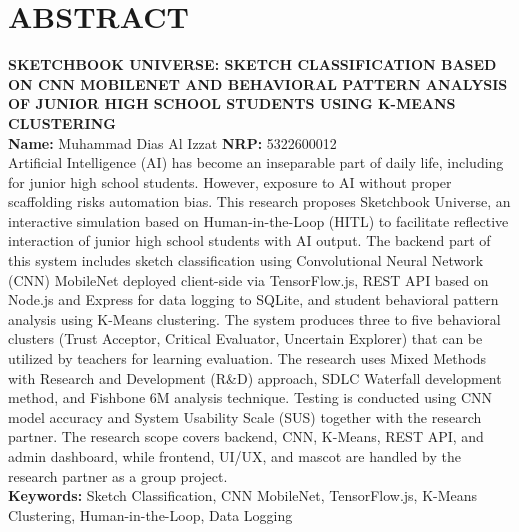 \documentclass[12pt,a4paper,oneside,openany]{report}
\begin{document}
\chapter*{ABSTRACT}
\thispagestyle{empty}
\textbf{SKETCHBOOK UNIVERSE: SKETCH CLASSIFICATION BASED ON CNN MOBILENET AND BEHAVIORAL PATTERN ANALYSIS OF JUNIOR HIGH SCHOOL STUDENTS USING K-MEANS CLUSTERING}\\[0.5cm]
\textbf{Name:} Muhammad Dias Al Izzat \quad \textbf{NRP:} 5322600012\\[1cm]
Artificial Intelligence (AI) has become an inseparable part of daily life, including for junior high school students. However, exposure to AI without proper scaffolding risks automation bias. This research proposes Sketchbook Universe, an interactive simulation based on Human-in-the-Loop (HITL) to facilitate reflective interaction of junior high school students with AI output. The backend part of this system includes sketch classification using Convolutional Neural Network (CNN) MobileNet deployed client-side via TensorFlow.js, REST API based on Node.js and Express for data logging to SQLite, and student behavioral pattern analysis using K-Means clustering. The system produces three to five behavioral clusters (Trust Acceptor, Critical Evaluator, Uncertain Explorer) that can be utilized by teachers for learning evaluation. The research uses Mixed Methods with Research and Development (R\&D) approach, SDLC Waterfall development method, and Fishbone 6M analysis technique. Testing is conducted using CNN model accuracy and System Usability Scale (SUS) together with the research partner. The research scope covers backend, CNN, K-Means, REST API, and admin dashboard, while frontend, UI/UX, and mascot are handled by the research partner as a group project.\\[1cm]
\textbf{Keywords:} Sketch Classification, CNN MobileNet, TensorFlow.js, K-Means Clustering, Human-in-the-Loop, Data Logging
\newpage

\tableofcontents
\newpage

\listoffigures
{}
\newpage

\listoftables
{}
\newpage

\clearpage


\end{document}
